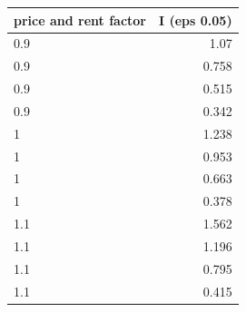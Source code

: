 \begin{tabular}{lr}
\toprule
price and rent factor & I (eps 0.05) \\
\midrule
0.9 & 1.07 \\
0.9 & 0.758 \\
0.9 & 0.515 \\
0.9 & 0.342 \\
1 & 1.238 \\
1 & 0.953 \\
1 & 0.663 \\
1 & 0.378 \\
1.1 & 1.562 \\
1.1 & 1.196 \\
1.1 & 0.795 \\
1.1 & 0.415 \\
\bottomrule
\end{tabular}
